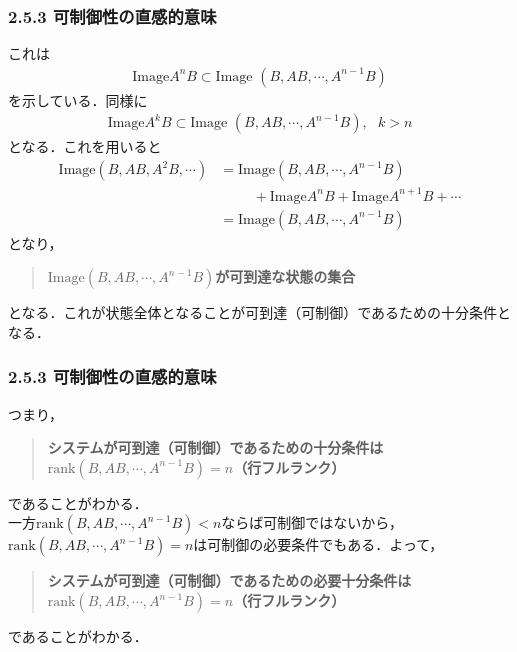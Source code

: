 \begin{frame}[t]
\frametitle{2.5.3 可制御性の直感的意味}
これは
\begin{align}
	\mbox{Image} A^{n} B \subset \mbox{Image }(B, A B, \cdots, A^{n-1} B )
\end{align}
を示している．同様に
\begin{align}
	\mbox{Image} A^{k} B \subset \mbox{Image }(B, A B, \cdots, A^{n-1} B )
	, \ \ \ k>n
\end{align}
となる．これを用いると
\begin{align}
	\mbox{Image} (B, AB, A^2B, \cdots) 
	&= \mbox{Image}(B, A B, \cdots, A^{n-1} B ) 
\nonumber \\
	& \hspace{1cm} + \mbox{Image} A^n B + \mbox{Image} A^{n+1} B + \cdots
\nonumber \\
	&= \mbox{Image}(B, A B, \cdots, A^{n-1} B ) 
\end{align}
となり，

\begin{quote}
{\bf $\mbox{Image}(B, A B, \cdots, A^{n-1} B ) $が可到達な状態の集合}
\end{quote}

となる．これが状態全体となることが可到達（可制御）であるための十分条件となる．
\end{frame}

\begin{frame}[t]
\frametitle{2.5.3 可制御性の直感的意味}
つまり，

\begin{quote}
{\bf システムが可到達（可制御）であるための十分条件は\\
$\mbox{rank}(B, A B, \cdots, A^{n-1} B )=n$（行フルランク）}
\end{quote}

であることがわかる．
\\[3mm]

一方$\mbox{rank}(B, A B, \cdots, A^{n-1} B )<n$ならば可制御ではないから，$\mbox{rank}(B, A B, \cdots, A^{n-1} B )=n$は可制御の必要条件でもある．よって，

\begin{quote}
{\bf システムが可到達（可制御）であるための必要十分条件は\\
$\mbox{rank}(B, A B, \cdots, A^{n-1} B )=n$（行フルランク）}
\end{quote}

であることがわかる．

\end{frame}

